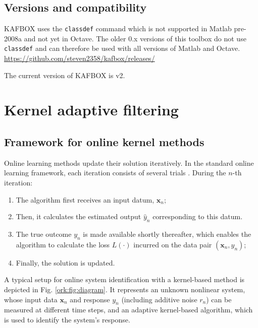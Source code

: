\documentclass[]{report}
\def\x{{\mathbf x}}
\begin{document}
\section{Versions and compatibility}

KAFBOX uses the \verb"classdef" command which is not supported in Matlab pre-2008a and not yet in Octave. The older 0.x versions of this toolbox do not use \verb"classdef" and can therefore be used with all versions of Matlab and Octave. \url{https://github.com/steven2358/kafbox/releases/}

The current version of KAFBOX is v2.


\chapter{Kernel adaptive filtering}

\section{Framework for online kernel methods}

Online learning methods update their solution iteratively. In the standard online learning framework, each iteration consists of several trials \cite{blum1998line}. During the $n$-th iteration:
\begin{enumerate}
\item The algorithm first receives an input datum, $\x_n$;
\item Then, it calculates the estimated output $\hat y_n$ corresponding to this datum.
\item The true outcome $y_n$ is made available shortly thereafter, which enables the algorithm to calculate the loss $L(\cdot)$ incurred on the data pair $(\x_n,y_n)$;
\item Finally, the solution is updated.
\end{enumerate}

A typical setup for online system identification with a kernel-based method is depicted in Fig. \ref{ork:fig:diagram}. It represents an unknown nonlinear system, whose input data $\x_n$ and response $y_n$ (including additive noise $r_n$) can be measured at different time steps, and an adaptive kernel-based algorithm, which is used to identify the system's response.
\end{document}
